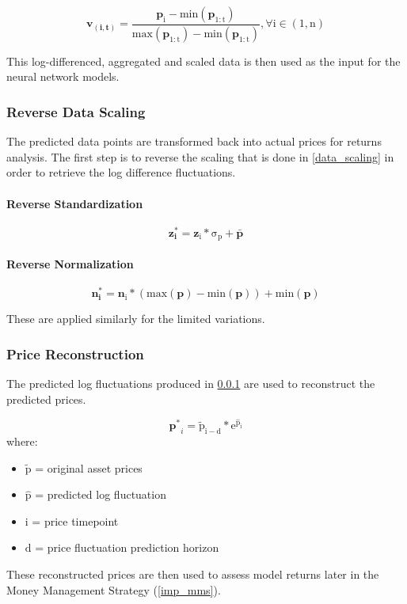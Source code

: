 \documentclass[a4paper,11pt,oneside]{article}
\theoremstyle{plain}
\theoremstyle{definition}
\begin{document}
\begin{equation}
\mathbf{v_{(i, t)}}  = \mathrm{ \frac{\mathbf{p}_i - min(\mathbf{p}_{1:t}) }{max(\mathbf{p}_{1:t}) - min(\mathbf{p}_{1:t})} , \forall  i \in (1, n)}
\end{equation}


This log-differenced, aggregated and scaled data is then used as the input for the neural network models.

\subsubsection{Reverse Data Scaling}\label{data_reverse_scaling}

The predicted data points are transformed back into actual prices for returns analysis. The first step is to reverse the scaling that is done in \ref{data_scaling} in order to retrieve the log difference fluctuations.

\paragraph{Reverse Standardization}

\begin{equation}
\mathbf{z^{*}_i} = \mathrm{{\mathbf{z}_i} * \sigma_p + \mathbf{\bar{p}}}
\end{equation}

\paragraph{Reverse Normalization}

\begin{equation}
\mathbf{n^{*}_i} = \mathrm{\mathbf{n}_i * (max(\mathbf{p}) - min(\mathbf{p})) + min(\mathbf{p})}
\end{equation}

These are applied similarly for the limited variations.

\subsubsection{Price Reconstruction}\label{data_price_recon}

The predicted log fluctuations produced in \ref{data_reverse_scaling} are used to reconstruct the predicted prices. 

\begin{equation}
\mathbf{p^*}_{i} = \mathrm{\tilde{p}_{i-d} * e^{\hat{p}_{i}}}
\end{equation}
where:
\begin{itemize}
	\item [] $\mathrm{\tilde{p}}$ = original asset prices
	\item [] $\mathrm{\hat{p}}$ = predicted log fluctuation 
	\item [] $\mathrm{i}$ = price timepoint 
	\item [] $\mathrm{d}$ = price fluctuation prediction horizon

\end{itemize}
\texttt{}\newline
These reconstructed prices are then used to assess model returns later in the Money Management Strategy (\ref{imp_mms}).
\end{document}
